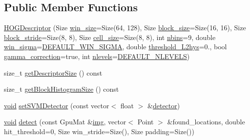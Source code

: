 \subsection*{Public Member Functions}
\begin{DoxyCompactItemize}
\item 
\hyperlink{structcv_1_1gpu_1_1HOGDescriptor_a78e335ea0e5aaa2bffc1de2053dc01d7}{H\-O\-G\-Descriptor} (Size \hyperlink{structcv_1_1gpu_1_1HOGDescriptor_a81c175ea3b25ddf619d5a693c6b011b0}{win\-\_\-size}=Size(64, 128), Size \hyperlink{structcv_1_1gpu_1_1HOGDescriptor_a2ffce0472743334cd00683e3ebf1aee5}{block\-\_\-size}=Size(16, 16), Size \hyperlink{structcv_1_1gpu_1_1HOGDescriptor_a64bd53b911a4b5399cf015b409ba1e85}{block\-\_\-stride}=Size(8, 8), Size \hyperlink{structcv_1_1gpu_1_1HOGDescriptor_ae9f565c6b25defa6a52ddabfd61bccb1}{cell\-\_\-size}=Size(8, 8), int \hyperlink{structcv_1_1gpu_1_1HOGDescriptor_a40800ea71ba0552bb8af9189f2c5fdf6}{nbins}=9, double \hyperlink{structcv_1_1gpu_1_1HOGDescriptor_a54487b481e329b2dc0d8d018a988b5ff}{win\-\_\-sigma}=\hyperlink{structcv_1_1gpu_1_1HOGDescriptor_adf9ce8dfaa7a56f91eaf329fd7eb2fc4a833f2a58ab55cf7a2cb49366d64d066b}{D\-E\-F\-A\-U\-L\-T\-\_\-\-W\-I\-N\-\_\-\-S\-I\-G\-M\-A}, double \hyperlink{structcv_1_1gpu_1_1HOGDescriptor_a7b1bb51bd628992aa16a775209062def}{threshold\-\_\-\-L2hys}=0., bool \hyperlink{structcv_1_1gpu_1_1HOGDescriptor_ad98fee76f0f3f497065f38a9a52af09c}{gamma\-\_\-correction}=true, int \hyperlink{structcv_1_1gpu_1_1HOGDescriptor_a8d4190de991a722004da4a8e724dffd9}{nlevels}=\hyperlink{structcv_1_1gpu_1_1HOGDescriptor_af4e544ecf8908d961b849f457c6db7a2ae00e31f310c33d88c6b1fe11f6146b16}{D\-E\-F\-A\-U\-L\-T\-\_\-\-N\-L\-E\-V\-E\-L\-S})
\item 
size\-\_\-t \hyperlink{structcv_1_1gpu_1_1HOGDescriptor_ae4f73a9a6ad1866c3ede2f9ef2d05623}{get\-Descriptor\-Size} () const 
\item 
size\-\_\-t \hyperlink{structcv_1_1gpu_1_1HOGDescriptor_ad1afa5615d0a43fdf0141c74f06effa9}{get\-Block\-Histogram\-Size} () const 
\item 
\hyperlink{legacy_8hpp_a8bb47f092d473522721002c86c13b94e}{void} \hyperlink{structcv_1_1gpu_1_1HOGDescriptor_a1ebf78116b1164d0f51fd87fc90823aa}{set\-S\-V\-M\-Detector} (const vector$<$ float $>$ \&\hyperlink{structcv_1_1gpu_1_1HOGDescriptor_a4d765f28f1af6854eda44e3406a0b122}{detector})
\item 
\hyperlink{legacy_8hpp_a8bb47f092d473522721002c86c13b94e}{void} \hyperlink{structcv_1_1gpu_1_1HOGDescriptor_a2bd4728715634b3ced2666cf0e24cbef}{detect} (const Gpu\-Mat \&\hyperlink{legacy_8hpp_a5349238b3772bed6eae0fda3117ccfef}{img}, vector$<$ Point $>$ \&found\-\_\-locations, double hit\-\_\-threshold=0, Size win\-\_\-stride=Size(), Size padding=Size())

\end{DoxyCompactItemize}

